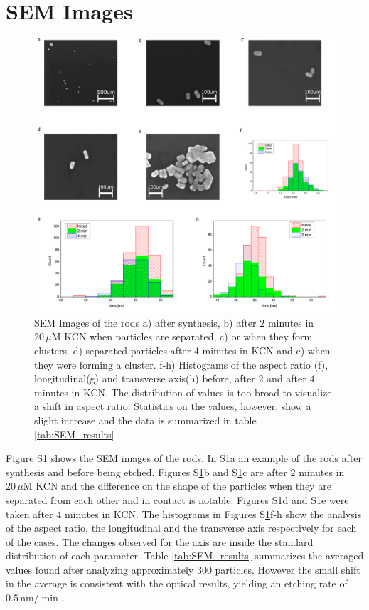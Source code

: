 \documentclass[a4paper,oneside,onecolumn]{article}
\newcommand{\uM}{\ensuremath{\,\mu\textrm{M}}}
\begin{document}
\section{SEM Images}

\begin{figure}[htp]
 \centering
 \includegraphics[width=0.95\linewidth]{Figures/04_Supporting/02_SEM/sem.png}
 \caption{SEM Images of the rods a) after synthesis, b) after $2$ minutes in
 $20\uM$ KCN when particles are separated, c) or when they form clusters. d)
 separated particles after $4$ minutes in KCN and e) when they were forming a
 cluster. f-h) Histograms of the aspect ratio (f), longitudinal(g) and
 transverse axis(h) before, after $2$ and after $4$ minutes in KCN. The distribution of values is too broad to visualize a shift in aspect ratio. Statistics on the values, however, show a slight increase and the data is summarized in table \ref{tab:SEM_results} }
 \label{fig:SEM}
\end{figure}

Figure S\ref{fig:SEM} shows the SEM images of the rods. In S\ref{fig:SEM}a an
example of the rods after synthesis and before being etched.
Figures S\ref{fig:SEM}b and S\ref{fig:SEM}c are after $2$ minutes in $20\uM$ KCN
and the difference on the shape of the particles when they are separated from each other and in contact is
notable. Figures S\ref{fig:SEM}d and S\ref{fig:SEM}e were taken after $4$
minutes in KCN.
The histograms in Figures S\ref{fig:SEM}f-h show the analysis of the aspect
ratio, the longitudinal and the transverse axis respectively for each of the  cases. The
changes observed for the axis are inside the standard distribution of each
parameter. Table \ref{tab:SEM_results} summarizes the averaged values found
after analyzing approximately $300$ particles. However the small shift in the
average is consistent with the optical results, yielding an etching rate of
$0.5\,\textrm{nm}/\min$.
\end{document}
